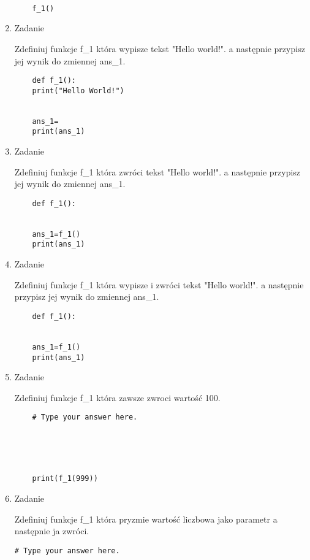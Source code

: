 \documentclass[11pt]{article}
\begin{document}
\begin{enumerate}
\begin{lstlisting}
		
	f_1()
\end{lstlisting}

\par
\item 
\begin{Large}
	Zadanie
\end{Large}
\par
Zdefiniuj funkcje f\_1 która wypisze tekst "Hello world!". a następnie przypisz jej wynik do zmiennej ans\_1.
\begin{lstlisting}
	def f_1():
	print("Hello World!")
	
		
	ans_1=
	print(ans_1)
\end{lstlisting}

\par
\item 
\begin{Large}
	Zadanie
\end{Large}
\par
Zdefiniuj funkcje f\_1 która zwróci tekst "Hello world!". a następnie przypisz jej wynik do zmiennej ans\_1.
\begin{lstlisting}
	def f_1():
	
	
	ans_1=f_1()
	print(ans_1)
\end{lstlisting}

\par
\item 
\begin{Large}
	Zadanie
\end{Large}
\par
Zdefiniuj funkcje f\_1 która wypisze i zwróci tekst "Hello world!". a następnie przypisz jej wynik do zmiennej ans\_1.
\begin{lstlisting}
	def f_1():
	
	
	ans_1=f_1()
	print(ans_1)
\end{lstlisting}

\par
\item 
\begin{Large}
	Zadanie
\end{Large}
\par
Zdefiniuj funkcje f\_1 która zawsze zwroci wartość 100.
\begin{lstlisting}
	# Type your answer here.
	
	
	
	
	
	print(f_1(999))
\end{lstlisting}


\par
\item 
\begin{Large}
	Zadanie
\end{Large}
\par
Zdefiniuj funkcje f\_1 która pryzmie wartość liczbowa jako parametr a następnie ja zwróci.
\begin{lstlisting}
# Type your answer here.






\end{lstlisting}
\end{enumerate}
\end{document}
